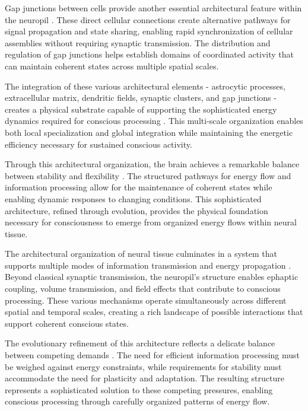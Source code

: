 \begin{refsection}
Gap junctions between cells provide another essential architectural feature within the neuropil \cite{Zeng2017}. These direct cellular connections create alternative pathways for signal propagation and state sharing, enabling rapid synchronization of cellular assemblies without requiring synaptic transmission. The distribution and regulation of gap junctions helps establish domains of coordinated activity that can maintain coherent states across multiple spatial scales.

The integration of these various architectural elements - astrocytic processes, extracellular matrix, dendritic fields, synaptic clusters, and gap junctions - creates a physical substrate capable of supporting the sophisticated energy dynamics required for conscious processing \cite{Bassett2017}. This multi-scale organization enables both local specialization and global integration while maintaining the energetic efficiency necessary for sustained conscious activity.

Through this architectural organization, the brain achieves a remarkable balance between stability and flexibility \cite{Buzsaki2006}. The structured pathways for energy flow and information processing allow for the maintenance of coherent states while enabling dynamic responses to changing conditions. This sophisticated architecture, refined through evolution, provides the physical foundation necessary for consciousness to emerge from organized energy flows within neural tissue.

The architectural organization of neural tissue culminates in a system that supports multiple modes of information transmission and energy propagation \cite{VanEssen2018}. Beyond classical synaptic transmission, the neuropil's structure enables ephaptic coupling, volume transmission, and field effects that contribute to conscious processing. These various mechanisms operate simultaneously across different spatial and temporal scales, creating a rich landscape of possible interactions that support coherent conscious states.

The evolutionary refinement of this architecture reflects a delicate balance between competing demands \cite{Hilgetag2020}. The need for efficient information processing must be weighed against energy constraints, while requirements for stability must accommodate the need for plasticity and adaptation. The resulting structure represents a sophisticated solution to these competing pressures, enabling conscious processing through carefully organized patterns of energy flow.


\end{refsection}
